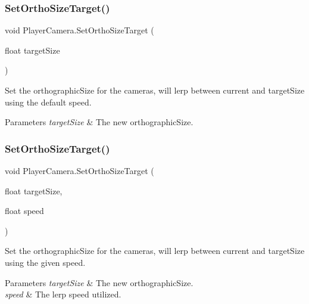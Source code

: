 \subsubsection{\texorpdfstring{Set\+Ortho\+Size\+Target()}{SetOrthoSizeTarget()}\hspace{0.1cm}{\footnotesize\ttfamily [1/2]}}
{\footnotesize\ttfamily void Player\+Camera.\+Set\+Ortho\+Size\+Target (\begin{DoxyParamCaption}\item[{float}]{target\+Size }\end{DoxyParamCaption})}



Set the orthographic\+Size for the cameras, will lerp between current and target\+Size using the default speed. 


\begin{DoxyParams}{Parameters}
{\em target\+Size} & The new orthographic\+Size.\\
\hline
\end{DoxyParams}
\hypertarget{class_player_camera_a5044d1e08bab8950660ceaea431d26b9}{}\label{class_player_camera_a5044d1e08bab8950660ceaea431d26b9} 
\subsubsection{\texorpdfstring{Set\+Ortho\+Size\+Target()}{SetOrthoSizeTarget()}\hspace{0.1cm}{\footnotesize\ttfamily [2/2]}}
{\footnotesize\ttfamily void Player\+Camera.\+Set\+Ortho\+Size\+Target (\begin{DoxyParamCaption}\item[{float}]{target\+Size,  }\item[{float}]{speed }\end{DoxyParamCaption})}



Set the orthographic\+Size for the cameras, will lerp between current and target\+Size using the given speed. 


\begin{DoxyParams}{Parameters}
{\em target\+Size} & The new orthographic\+Size.\\
\hline
{\em speed} & The lerp speed utilized.\\
\hline
\end{DoxyParams}
\hypertarget{class_player_camera_ab00e29987f641e819d30afd424905a83}{}\label{class_player_camera_ab00e29987f641e819d30afd424905a83} 
